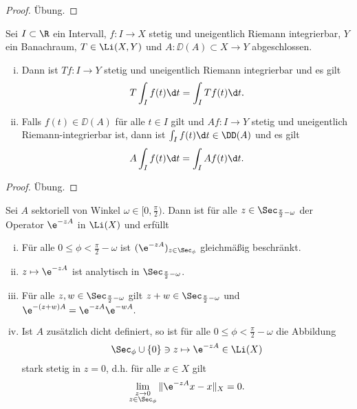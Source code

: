 \begin{proof}
  Übung.
\end{proof}

\begin{prop}
  \label{prop:opInIntegral}
  Sei $I \subset \R$ ein Intervall, $f \colon I \to X$ stetig und uneigentlich Riemann integrierbar, $Y$ ein Banachraum, $T \in \Li(X,Y)$ und $A \colon \DD(A) \subset X \to Y$ abgeschlossen.
  \begin{enumerate}[(i)]
    \item Dann ist $Tf \colon I \to Y$ stetig und uneigentlich Riemann integrierbar und es gilt
      $$
      T \int_I f(t) \d t = \int_I Tf(t)\d t.
      $$
    \item Falls $f(t) \in \DD(A)$ für alle $t \in I$ gilt und $Af \colon I \to Y$ stetig und uneigentlich Riemann-integrierbar ist, dann ist $\int_I f(t) \d t \in \DD(A)$ und es gilt 
      $$
      A \int_I f(t) \d t = \int_I A f(t) \d t.
      $$
  \end{enumerate}
\end{prop}

\begin{proof}
  Übung.
\end{proof}

\begin{thm}
  Sei $A$ sektoriell von Winkel $\omega \in [0,\frac{\pi}{2})$.
    Dann ist für alle $z \in \Sec_{\frac{\pi}{2} - \omega}$ der Operator $\e^{-zA}$ in $\Li(X)$ und erfüllt
    \begin{enumerate}[(i)]
      \item Für alle $0 \leq \phi < \frac{\pi}{2} - \omega$ ist $(\e^{-zA})_{z \in \Sec_\phi}$ gleichmäßig beschränkt.
      \item $z \mapsto \e^{-zA}$ ist analytisch in $\Sec_{\frac{\pi}{2} - \omega}$.
      \item Für alle $z,w \in \Sec_{\frac{\pi}{2} - \omega}$ gilt $z + w \in \Sec_{\frac{\pi}{2} - \omega}$ und
        $
        \e^{-(z + w)A} = \e^{-zA}\e^{-w A}.
        $
      \item Ist $A$ zusätzlich dicht definiert, so ist für alle $0 \leq \phi < \frac{\pi}{2} - \omega$ die Abbildung
        $$
        \Sec_\phi \cup \{0\} \ni z \mapsto \e^{-z A} \in \Li(X)
        $$
        stark stetig in $z = 0$, d.h. für alle $x \in X$ gilt
        $$
        \lim_{\substack{z \to 0 \\ z \in \Sec_\phi}} \|\e^{-zA} x - x\|_X = 0.
        $$
    \end{enumerate}
\end{thm}


